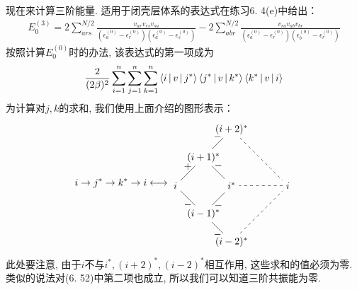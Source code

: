 现在来计算三阶能量. 
适用于闭壳层体系的表达式在练习6.
4(e)中给出：
\begin{align}
E_0^{(3)} = 2\sum_{ars}^{N/2}\frac{v_{ar}v_{rs}v_{sa}}{(\epsilon^{(0)}_a-\epsilon^{(0)}_r)(\epsilon^{(0)}_a-\epsilon^{(0)}_s)} - 2\sum_{abr}^{N/2}\frac{v_{ra}v_{ab}v_{br}}{(\epsilon^{(0)}_a-\epsilon^{(0)}_r)(\epsilon^{(0)}_b-\epsilon^{(0)}_r)}
\end{align}
按照计算$E_0^{(0)}$时的办法, 
该表达式的第一项成为
\begin{align}
\frac{2}{(2\beta)^2}\sum_{i=1}^{n}\sum_{j=1}^{n}\sum_{k=1}^{n}\Braket{i|v|j^*}\Braket{j^*|v|k^*}\Braket{k^*|v|i}
\end{align}
为计算对$j,k$的求和, 
我们使用上面介绍的图形表示：
\begin{align*}
i\to j^* \to k^* \to i \longleftrightarrow 
\begin{tikzpicture}[baseline={(0,0)}]
\node(i)at(0,0){$i$};\node(ip1)at(1,1){$(i+1)^*$};\node(ip2)at(2,2){$(i+2)^*$};\node(is)at(2,0){$i^*$};\node(im1)at(1,-1){$(i-1)^*$};\node(im2)at(2,-2){$(i-2)^*$};\node(ie)at(4,0){$i$};
\draw (i)--node[above]{+}(ip1)--node[above]{$-$}(is)--node[below]{$-$}(im1)--node[below]{$-$}(i);
\draw (ip1)--node[above]{$-$}(ip2);
\draw (im1)--node[below]{$-$}(im2);
\draw[dashed] (ip2)--(ie)--(is);
\draw[dashed] (im2)--(ie);
\end{tikzpicture}
\end{align*}
此处要注意, 
由于$i$不与$i^*,(i+2)^*,(i-2)^*$相互作用, 
这些求和的值必须为零. 
类似的说法对(6.
52)中第二项也成立, 
所以我们可以知道三阶共振能为零.


